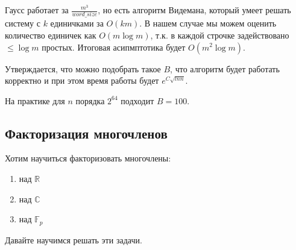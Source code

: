 Гаусс работает за $\frac{m^3}{word\_size}$, но есть алгоритм Видемана, который умеет решать систему с $k$ единичками за $O(km)$.
В нашем случае мы можем оценить количество единичек как $O(m \log m)$, т.к. в каждой строчке задействовано $\leqslant \log m$ простых.
Итоговая асипмптотика будет $O(m^2 \log m)$.

Утверждается, что можно подобрать такое $B$, что алгоритм будет работать корректно и при этом время работы будет $e^{C\sqrt{ln n}}$.

На практике для $n$ порядка $2^{64}$ подходит $B=100$.

\subsection{Факторизация многочленов}

Хотим научиться факторизовать многочлены:
\begin{enumerate}
	\item
		над $\mathbb{R}$
	\item
		над $\mathbb{C}$
	\item
		над $\mathbb{F}_p$
\end{enumerate}                                    

Давайте научимся решать эти задачи.

